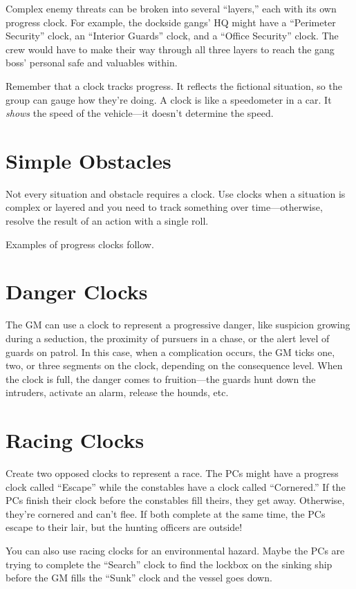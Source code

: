 \documentclass[11pt,fleqn,a5paper]{book}
\begin{document}
Complex enemy threats can be broken into several “layers,” each with its own progress clock. For example, the dockside gangs’ HQ might have a “Perimeter Security” clock, an “Interior Guards” clock, and a “Office Security” clock. The crew would have to make their way through all three layers to reach the gang boss’ personal safe and valuables within.

Remember that a clock tracks progress. It reflects the fictional situation, so the group can gauge how they’re doing. A clock is like a speedometer in a car. It \emph{shows} the speed of the vehicle---it doesn’t determine the speed.

\section{Simple Obstacles}

Not every situation and obstacle requires a clock. Use clocks when a situation is complex or layered and you need to track something over time---otherwise, resolve the result of an action with a single roll.

Examples of progress clocks follow.

\section{Danger Clocks}

The GM can use a clock to represent a progressive danger, like suspicion growing during a seduction, the proximity of pursuers in a chase, or the alert level of guards on patrol. In this case, when a complication occurs, the GM ticks one, two, or three segments on the clock, depending on the consequence level. When the clock is full, the danger comes to fruition---the guards hunt down the intruders, activate an alarm, release the hounds, etc.

\section{Racing Clocks}

Create two opposed clocks to represent a race. The PCs might have a progress clock called “Escape” while the constables have a clock called “Cornered.” If the PCs finish their clock before the constables fill theirs, they get away. Otherwise, they’re cornered and can’t flee. If both complete at the same time, the PCs escape to their lair, but the hunting officers are outside!

You can also use racing clocks for an environmental hazard. Maybe the PCs are trying to complete the “Search” clock to find the lockbox on the sinking ship before the GM fills the “Sunk” clock and the vessel goes down.
\end{document}
